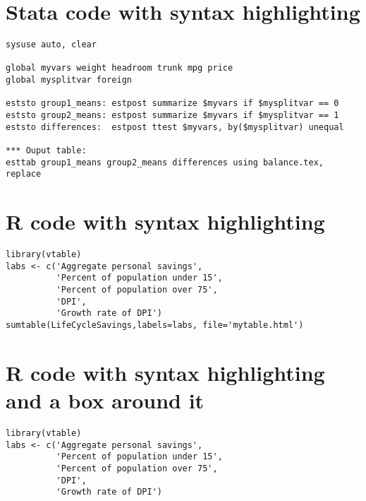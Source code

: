 \documentclass[12pt,a4paper]{article}
\begin{document}
\section{Stata code with syntax highlighting}

\begin{verbatim}
sysuse auto, clear

global myvars weight headroom trunk mpg price
global mysplitvar foreign

eststo group1_means: estpost summarize $myvars if $mysplitvar == 0
eststo group2_means: estpost summarize $myvars if $mysplitvar == 1
eststo differences:  estpost ttest $myvars, by($mysplitvar) unequal

*** Ouput table:
esttab group1_means group2_means differences using balance.tex, replace
\end{verbatim}

\section{R code with syntax highlighting}

\begin{verbatim}
library(vtable)
labs <- c('Aggregate personal savings',
          'Percent of population under 15',
          'Percent of population over 75',
          'DPI',
          'Growth rate of DPI')
sumtable(LifeCycleSavings,labels=labs, file='mytable.html')
\end{verbatim}

\section{R code with syntax highlighting and a box around it}

\begin{tcolorbox}[title=My R code]
\begin{verbatim}
library(vtable)
labs <- c('Aggregate personal savings',
          'Percent of population under 15',
          'Percent of population over 75',
          'DPI',
          'Growth rate of DPI')
\end{verbatim}
\end{tcolorbox}
\end{document}
